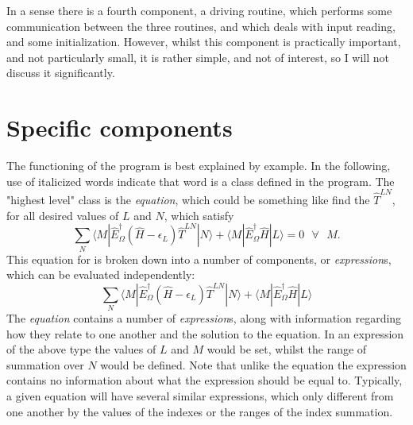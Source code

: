 \noindent In a sense there is a fourth component, a driving routine, which
performs some communication between the three routines, and which deals with
input reading, and some initialization. However, whilst this component is practically
important, and not particularly small, it is rather simple, and not of
interest, so I will not discuss it significantly.

\section*{ Specific components}
The functioning of the program is best explained by example. In the following,
use of italicized words indicate that word is a class defined in the program.
The "highest level" class is the \emph{equation}, which could be something like 
find the $\hat{T}^{LN}$, for all desired values of $L$ and $N$, which satisfy 
\begin{equation}
\sum_{N} 
\langle M | \hat{E}^{\dagger}_{\Omega} (\hat{H}-\epsilon_{L}) \hat{T}^{LN} | N \rangle  +
\langle M | \hat{E}^{\dagger}_{\Omega} \hat{H} | L  \rangle = 0 \text{ \ \ \ \ } \forall \text{ \ \ }  M . 
\end{equation}
\noindent This equation for is broken down into a number of components, 
or \emph{expression}s, which can be evaluated independently:
\begin{equation}
\sum_{N} 
\langle M | \hat{E}^{\dagger}_{\Omega} (\hat{H}-\epsilon_{L}) \hat{T}^{LN} | N \rangle  +
\langle M | \hat{E}^{\dagger}_{\Omega} \hat{H} | L  \rangle  
\label{eqn:Hylleras}
\end{equation}
\noindent The \emph{equation} contains a number of \emph{expression}s, along with
information regarding how they relate to one another and the solution to the equation.
In an expression of the above type the values of $L$ and $M$  would be set, whilst the range of
summation over $N$ would be defined. Note that unlike the equation the expression
contains no information about what the expression should be equal to.
Typically, a given equation will have several similar expressions,
which only different from one another by the values of the indexes or the 
ranges of the index summation.\\

